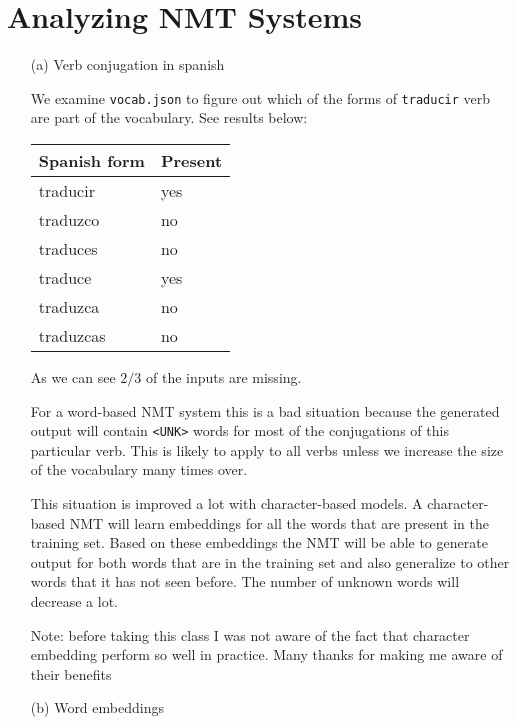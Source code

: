 \documentclass{article}
\begin{document}
\clearpage
\section{Analyzing NMT Systems}

\begin{enumerate}

\item[(a)]{Verb conjugation in spanish}

We examine \texttt{vocab.json} to figure out which of the forms of \texttt{traducir} verb are part of the vocabulary. See results below:

\begin{center}
\begin{tabular}{l|l}
\toprule
Spanish form & Present \\
\midrule
traducir & yes\\
traduzco & no\\
traduces & no\\
traduce & yes\\
traduzca & no\\
traduzcas & no\\
\bottomrule
\end{tabular}
\end{center}

As we can see $2/3$ of the inputs are missing.

For a word-based NMT system this is a bad situation because the generated output will contain \texttt{<UNK>} words for most of the conjugations of this particular verb. This is likely to apply to all verbs unless we increase the size of the vocabulary many times over.

This situation is improved a lot with character-based models. A character-based NMT will learn embeddings for all the words that are present in the training set. Based on these embeddings the NMT will be able to generate output for both words that are in the training set and also generalize to other words that it has not seen before. The number of unknown words will decrease a lot. 

Note: before taking this class I was not aware of the fact that character embedding perform so well in practice. Many thanks for making me aware of their benefits

\clearpage

\item[(b)]{Word embeddings}

\begin{itemize}


\end{itemize}
\end{enumerate}
\end{document}
